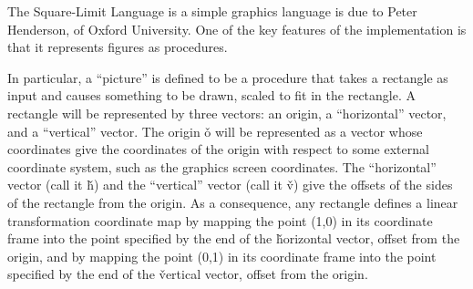 % 
% 
% 
% 
% 
% 



The Square-Limit Language is a simple graphics language is due to Peter
Henderson, of Oxford University.  One of the key features of 
the implementation is that it represents figures as procedures.

In particular, a ``picture'' is defined to be a procedure that takes a
rectangle as
input and causes something to be drawn, scaled to fit in the
rectangle.  A rectangle will be represented by three vectors: an
origin, a ``horizontal'' vector, and a ``vertical'' vector.   The origin \v{o}
will be represented as a vector whose coordinates give the coordinates
of the origin with respect to some external coordinate system, such as
the graphics screen coordinates.  The ``horizontal'' vector (call it
\v{h}) and the ``vertical'' vector (call it \v{v}) give the offsets of
the sides of the rectangle from the origin.  As a consequence, any
rectangle defines a linear transformation coordinate map by
mapping the point (1,0) in its coordinate frame into the point specified
by the end of the \v{horizontal} vector, offset from the origin, and by
mapping the point (0,1) in its coordinate frame into the point specified
by the end of the \v{vertical} vector, offset from the origin.

